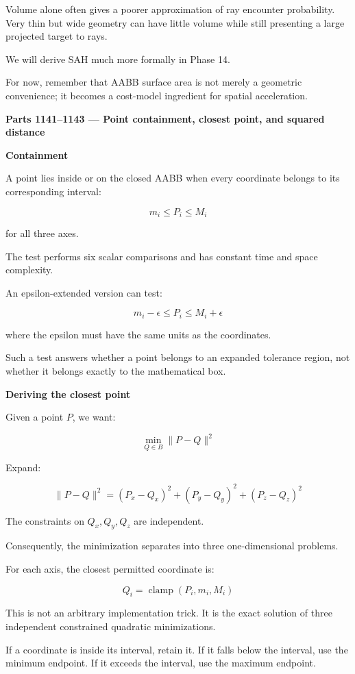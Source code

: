 Volume alone often gives a poorer approximation of ray encounter probability. Very thin but wide geometry can have little volume while still presenting a large projected target to rays.

We will derive SAH much more formally in Phase 14.

For now, remember that AABB surface area is not merely a geometric convenience; it becomes a cost-model ingredient for spatial acceleration.

\textbf{Parts 1141--1143 --- Point containment, closest point, and squared distance}

\textbf{Containment}

A point lies inside or on the closed AABB when every coordinate belongs to its corresponding interval:

\[
\boxed{ m_i\le P_i\le M_i }
\]

for all three axes.

The test performs six scalar comparisons and has constant time and space complexity.

An epsilon-extended version can test:

\[
m_i-\epsilon\le P_i\le M_i+\epsilon
\]

where the epsilon must have the same units as the coordinates.

Such a test answers whether a point belongs to an expanded tolerance region, not whether it belongs exactly to the mathematical box.

\textbf{Deriving the closest point}

Given a point \(P\), we want:

\[
\min_{Q\in B}\|P-Q\|^2
\]

Expand:

\[
\|P-Q\|^2= (P_x-Q_x)^2+ (P_y-Q_y)^2+ (P_z-Q_z)^2
\]

The constraints on \(Q_x,Q_y,Q_z\) are independent.

Consequently, the minimization separates into three one-dimensional problems.

For each axis, the closest permitted coordinate is:

\[
\boxed{ Q_i=\operatorname{clamp}(P_i,m_i,M_i) }
\]

This is not an arbitrary implementation trick. It is the exact solution of three independent constrained quadratic minimizations.

If a coordinate is inside its interval, retain it. If it falls below the interval, use the minimum endpoint. If it exceeds the interval, use the maximum endpoint.

